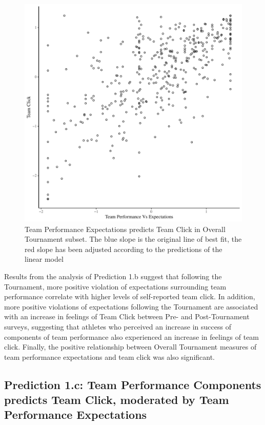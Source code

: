 \begin{CJK}{UTF8}{gbsn}
   \begin{figure}[htbp]
     \centering
   \includegraphics[scale=.5]{images/teamPerfClickOverallBasicXY.pdf}
     \caption{Team Performance Expectations predicts Team Click in Overall Tournament subset. The blue slope is the original line of best fit, the red slope has been adjusted according to the predictions of the linear model}
     \label{fig:teamPerfClickOverallModelSlope}
   \end{figure}

Results from the analysis of Prediction 1.b suggest that following the Tournament, more positive violation of expectations surrounding team performance correlate with higher levels of self-reported team click.  In addition, more positive violations of expectations following the Tournament are associated with an increase in feelings of Team Click between Pre- and Post-Tournament surveys, suggesting that athletes who perceived an increase in success of components of team performance also experienced an increase in feelings of team click.  Finally, the positive relationship between Overall Tournament measures of team performance expectations and team click was also significant.




\subsection{Prediction 1.c: Team Performance Components predicts Team Click, moderated by Team Performance Expectations}


\end{CJK}

